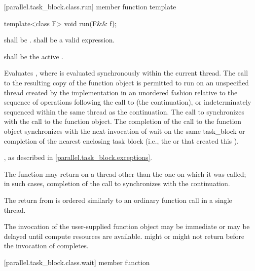 [parallel.task_block.class.run]{ member function template }

\begin{itemdecl}
template<class F> void run(F&& f);
\end{itemdecl}

\begin{itemdescr}
\pnum \requires {} shall be .  shall be a valid expression.

\pnum \preconditions {} shall be the active .

\pnum \effects Evaluates , where
 is evaluated synchronously within the
current thread. The call to the resulting copy of the function object is
permitted to run on an unspecified thread created by the implementation in an
unordered fashion relative to the sequence of operations following the call to
 (the continuation), or indeterminately sequenced within the same thread
as the continuation. The call to  synchronizes with the call to the function
object. The completion of the call to the function object synchronizes with the
next invocation of wait on the same task_block or completion of the nearest
enclosing task block (i.e., the  or
     that created this ).

\pnum \throws {}, as described in \ref{parallel.task_block.exceptions}.

\pnum \remarks The  function may return on a thread other than the
one on which it was called; in such cases, completion of the call to
 synchronizes with the continuation. \begin{note}The return from
 is ordered similarly to an ordinary function call in a single
thread.\end{note}

\pnum \remarks The invocation of the user-supplied function object 
may be immediate or may be delayed until compute resources are available.
 might or might not return before the invocation of 
completes.

\end{itemdescr}

[parallel.task_block.class.wait]{ member function }

